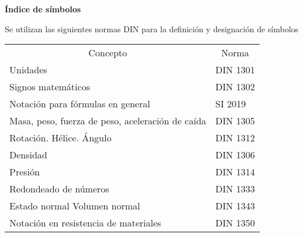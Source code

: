 

\newpage
{}
\tableofcontents 
\newpage

\listoffigures 
\newpage

\listoftables 
\newpage


\begin{center}
	{\Large  \textbf{Índice de símbolos}}
\end{center}

Se utilizan las siguientes normas DIN para la definición y designación de símbolos\\

\begin{mytable}[H]
	\centering
	\begin{tabular}{ll}
		\multicolumn{1}{c}{Concepto} & \multicolumn{1}{c}{Norma} \\
		Unidades & DIN 1301 \\
		Signos matemáticos & DIN 1302 \\
		Notación para fórmulas en general & SI 2019 \\
		Masa, peso, fuerza de peso, aceleración de caída & DIN 1305 \\
		Rotación. Hélice. Ángulo & DIN 1312 \\
		Densidad & DIN 1306 \\
		Presión & DIN 1314 \\
		Redondeado de números & DIN 1333 \\
		Estado normal Volumen normal & DIN 1343 \\
		Notación en resistencia de materiales & DIN 1350
	\end{tabular}
\end{mytable}


